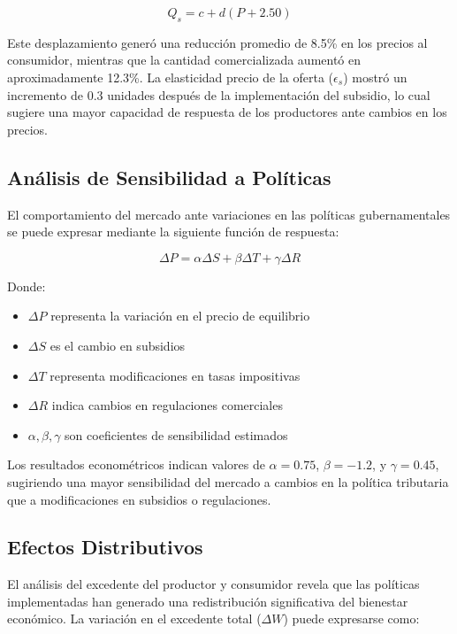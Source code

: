 \documentclass[12pt, a4paper]{article}
\begin{document}
\begin{equation}
Q_s = c + d(P + 2.50)
\end{equation}

Este desplazamiento generó una reducción promedio de 8.5\% en los precios al consumidor, mientras que la cantidad comercializada aumentó en aproximadamente 12.3\%. La elasticidad precio de la oferta ($\epsilon_s$) mostró un incremento de 0.3 unidades después de la implementación del subsidio, lo cual sugiere una mayor capacidad de respuesta de los productores ante cambios en los precios.

\subsection{Análisis de Sensibilidad a Políticas}

El comportamiento del mercado ante variaciones en las políticas gubernamentales se puede expresar mediante la siguiente función de respuesta:

\begin{equation}
\Delta P = \alpha\Delta S + \beta\Delta T + \gamma\Delta R
\end{equation}

Donde:
\begin{itemize}
    \item $\Delta P$ representa la variación en el precio de equilibrio
    \item $\Delta S$ es el cambio en subsidios
    \item $\Delta T$ representa modificaciones en tasas impositivas
    \item $\Delta R$ indica cambios en regulaciones comerciales
    \item $\alpha, \beta, \gamma$ son coeficientes de sensibilidad estimados
\end{itemize}

Los resultados econométricos indican valores de $\alpha = 0.75$, $\beta = -1.2$, y $\gamma = 0.45$, sugiriendo una mayor sensibilidad del mercado a cambios en la política tributaria que a modificaciones en subsidios o regulaciones.

\subsection{Efectos Distributivos}

El análisis del excedente del productor y consumidor revela que las políticas implementadas han generado una redistribución significativa del bienestar económico. La variación en el excedente total ($\Delta W$) puede expresarse como:
\end{document}
